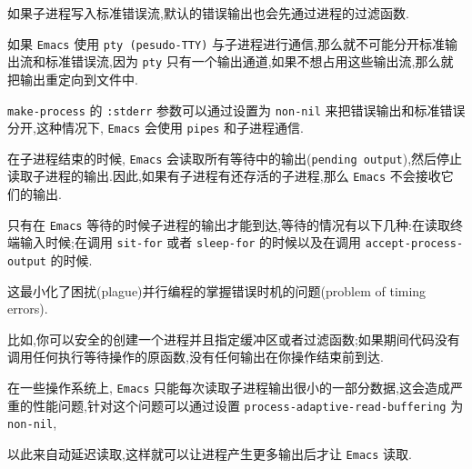 \documentclass[11pt]{article}
\begin{document}
如果子进程写入标准错误流,默认的错误输出也会先通过进程的过滤函数.

如果 \texttt{Emacs} 使用 \texttt{pty (pesudo-TTY)} 与子进程进行通信,那么就不可能分开标准输出流和标准错误流,因为 \texttt{pty} 只有一个输出通道,如果不想占用这些输出流,那么就把输出重定向到文件中.

\texttt{make-process} 的 \texttt{:stderr} 参数可以通过设置为 \texttt{non-nil} 来把错误输出和标准错误分开,这种情况下, \texttt{Emacs} 会使用 \texttt{pipes} 和子进程通信.

在子进程结束的时候, \texttt{Emacs} 会读取所有等待中的输出(\texttt{pending output}),然后停止读取子进程的输出.因此,如果有子进程有还存活的子进程,那么 \texttt{Emacs} 不会接收它们的输出.

只有在 \texttt{Emacs} 等待的时候子进程的输出才能到达,等待的情况有以下几种:在读取终端输入时候;在调用 \texttt{sit-for} 或者 \texttt{sleep-for} 的时候以及在调用 \texttt{accept-process-output} 的时候.

这最小化了困扰(plague)并行编程的掌握错误时机的问题(problem of timing errors).

比如,你可以安全的创建一个进程并且指定缓冲区或者过滤函数;如果期间代码没有调用任何执行等待操作的原函数,没有任何输出在你操作结束前到达.


在一些操作系统上, \texttt{Emacs} 只能每次读取子进程输出很小的一部分数据,这会造成严重的性能问题,针对这个问题可以通过设置 \texttt{process-adaptive-read-buffering} 为 \texttt{non-nil},

以此来自动延迟读取,这样就可以让进程产生更多输出后才让 \texttt{Emacs} 读取.
\end{document}
